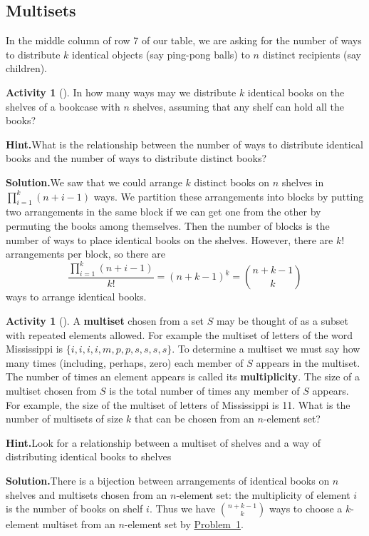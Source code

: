 \documentclass[10pt,]{book}
\newcommand{\terminology}[1]{\textbf{#1}}
\theoremstyle{plain}
\theoremstyle{definition}
\newtheorem{activity}[project]{Activity}
\numberwithin{equation}{chapter}
\begin{document}
\subsection[{Multisets}]{Multisets}\label{subsection-30}
In the middle column of row 7 of our table, we are asking for the number of ways to distribute \(k\) identical objects (say ping-pong balls) to \(n\) distinct recipients (say children).%
\begin{activity}[]\label{identicalbooks}
In how many ways may we distribute \(k\) identical books on the shelves of a bookcase with \(n\) shelves, assuming that any shelf can hold all the books?%
\par\medskip\noindent%
\textbf{Hint.}\quad What is the relationship between the number of ways to distribute identical books and the number of ways to distribute distinct books?%
\par\medskip\noindent%
\textbf{Solution.}\quad We saw that we could arrange \(k\) distinct books on \(n\) shelves in \(\prod_{i=1}^k (n+i-1)\) ways. We partition these arrangements into blocks by putting two arrangements in the same block if we can get one from the other by permuting the books among themselves. Then the number of blocks is the number of ways to place identical books on the shelves. However, there are \(k!\) arrangements per block, so there are%
\begin{equation*}
\frac{\prod_{i=1}^k (n+i-1)}{k!}=(n+k-1)^{\underline{k}}= \binom{n+k-1}{k}
\end{equation*}
ways to arrange identical books.%
\end{activity}
\begin{activity}[]\label{multiset}
A \terminology{multiset} chosen from a set \(S\) may be thought of as a subset with repeated elements allowed. For example the multiset of letters of the word Mississippi is \(\{i,i,i,i,m,p,p,s,s,s,s\}\). To determine a multiset we must say how many times (including, perhaps, zero) each member of \(S\) appears in the multiset. The number of times an element appears is called its \terminology{multiplicity}. The size of a multiset chosen from \(S\) is the total number of times any member of \(S\) appears. For example, the size of the multiset of letters of Mississippi is 11. What is the number of multisets of size \(k\) that can be chosen from an \(n\)-element set?%
\par\medskip\noindent%
\textbf{Hint.}\quad Look for a relationship between a multiset of shelves and a way of distributing identical books to shelves%
\par\medskip\noindent%
\textbf{Solution.}\quad There is a bijection between arrangements of identical books on \(n\) shelves and multisets chosen from an \(n\)-element set: the multiplicity of element \(i\) is the number of books on shelf \(i\). Thus we have \(\binom{n+k-1}{k}\) ways to choose a \(k\)-element multiset from an \(n\)-element set by \hyperref[identicalbooks]{Problem~\ref{identicalbooks}}.%
\end{activity}
\end{document}
